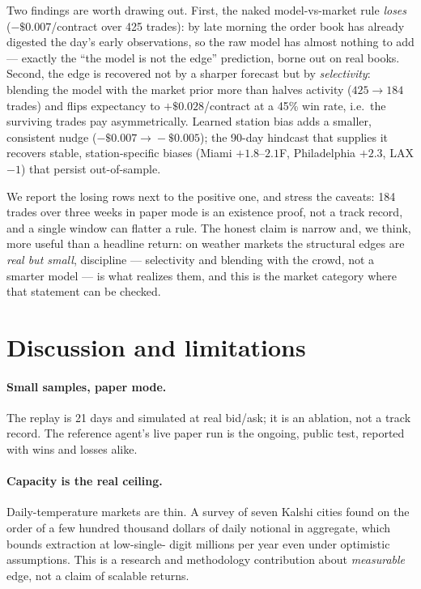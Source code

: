 \documentclass[10pt,twocolumn]{article}
\begin{document}
Two findings are worth drawing out. First, the naked model-vs-market rule
\emph{loses} ($-\$0.007$/contract over 425 trades): by late morning the order book
has already digested the day's early observations, so the raw model has almost
nothing to add --- exactly the ``the model is not the edge'' prediction, borne out
on real books. Second, the edge is recovered not by a sharper forecast but by
\emph{selectivity}: blending the model with the market prior more than halves
activity ($425\!\to\!184$ trades) and flips expectancy to $+\$0.028$/contract at a
45\% win rate, i.e.\ the surviving trades pay asymmetrically. Learned station bias
adds a smaller, consistent nudge ($-\$0.007\!\to\!-\$0.005$); the 90-day hindcast
that supplies it recovers stable, station-specific biases (Miami
$+1.8$--$2.1$\textdegree F, Philadelphia $+2.3$, LAX $-1$) that persist
out-of-sample.

We report the losing rows next to the positive one, and stress the caveats: 184
trades over three weeks in paper mode is an existence proof, not a track record,
and a single window can flatter a rule. The honest claim is narrow and, we think,
more useful than a headline return: on weather markets the structural edges are
\emph{real but small}, discipline --- selectivity and blending with the crowd, not
a smarter model --- is what realizes them, and this is the market category where
that statement can be checked.

\section{Discussion and limitations}

\paragraph{Small samples, paper mode.} The replay is 21 days and simulated at
real bid/ask; it is an ablation, not a track record. The reference agent's live
paper run is the ongoing, public test, reported with wins and losses alike.

\paragraph{Capacity is the real ceiling.} Daily-temperature markets are thin.
A survey of seven Kalshi cities found on the order of a few hundred thousand
dollars of daily notional in aggregate, which bounds extraction at low-single-
digit millions per year even under optimistic assumptions. This is a research and
methodology contribution about \emph{measurable} edge, not a claim of scalable
returns.
\end{document}
